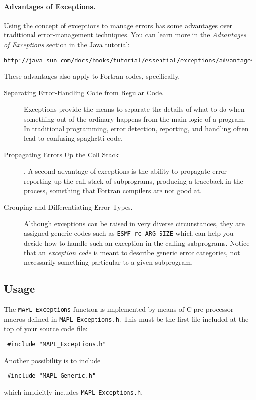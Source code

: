 \paragraph{Advantages of Exceptions.} Using the concept of exceptions
to manage errors has some advantages over traditional error-management
techniques. You can learn more in the {\em Advantages of Exceptions}
section in the Java tutorial:
\begin{verbatim}
http://java.sun.com/docs/books/tutorial/essential/exceptions/advantages.html
\end{verbatim}
These advantages also apply to Fortran codes, specifically,
\begin{description}

\item[Separating Error-Handling Code from Regular Code.] Exceptions
  provide the means to separate the details of what to do when
  something out of the ordinary happens from the main logic of a
  program. In traditional programming, error detection, reporting, and
  handling often lead to confusing spaghetti code.
  
\item[Propagating Errors Up the Call Stack].  A second advantage of
  exceptions is the ability to propagate error reporting up the call
  stack of subprograms, producing a traceback in the process,
  something that Fortran compilers are not good at.

\item[Grouping and Differentiating Error Types.] Although exceptions
  can be raised in very diverse circunstances, they are assigned
  generic codes such as {\tt ESMF\_rc\_ARG\_SIZE} which can help you
  decide how to handle such an exception in the calling
  subprograms. Notice that an {\em exception code} is meant to
  describe generic error categories, not necessarily something
  particular to a given subprogram.
\end{description}

\subsection*{Usage}

The {\tt MAPL\_Exceptions} function is implemented by means of C
pre-processor macros defined in {\tt MAPL\_Exceptions.h}. This must be
the first file included at the top of your source code file:
\begin{verbatim}
 #include "MAPL_Exceptions.h"
\end{verbatim}
Another possibility is to include
\begin{verbatim}
 #include "MAPL_Generic.h"
\end{verbatim}
which implicitly includes {\tt MAPL\_Exceptions.h}. 

